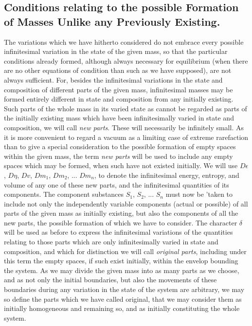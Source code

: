 \documentclass[12pt]{memoir}
\begin{document}
\subsection{Conditions relating to the possible Formation of Masses Unlike any Previously Existing.}
The variations which we have hitherto considered do not embrace every possible infinitesimal variation in the state of the given mass, so that the particular conditions already formed, although always necessary for equilibrium (when there are no other equations of condition than such as we have supposed), are not always sufficient. For, besides the infinitesimal variations in the state and composition of different parts of the given mass, infinitesimal masses may be formed entirely different in state and composition from any initially existing. Such parts of the whole mass in its varied state as cannot be regarded as parts of the initially existing mass which have been infinitesimally varied in state and composition, we will call \textit{new parts}. These will necessarily be infinitely small. As it is more convenient to regard a vacuum as a limiting case of extreme rarefaction than to give a special consideration to the possible formation of empty spaces within the given mass, the term \textit{new parts} will be used to include any empty spaces which may be formed, when such have not existed initially. We will use $D\epsilon$, $D\eta$, $Dv$, $Dm_1$, $Dm_2$, ... $Dm_n$, to denote the infinitesimal energy, entropy, and volume of any one of these new parts, and the infinitesimal quantities of its components. The component substances $S_1$, $S_2$, ... $S_n$ must now be 'taken to include not only the independently variable components (actual or possible) of all parts of the given mass as initially existing, but also the components of all the new parts, the possible formation of which we have to consider. The character $\delta$ will be used as before to express the infinitesimal variations of the quantities relating to those parts which are only infinitesimally varied in state and composition, and which for distinction we will call \textit{original parts}, including under this term the empty spaces, if such exist initially, within the envelop bounding the system. As we may divide the given mass into as many parts as we choose, and as not only the initial boundaries, but also the movements of these boundaries during any variation in the state of the system are arbitrary, we may so define the parts which we have called original, that we may consider them as initially homogeneous and remaining so, and as initially constituting the whole system.
\end{document}
